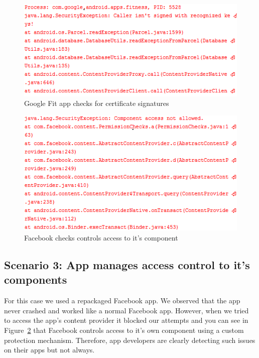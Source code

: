 \begin{figure}[tb]
\centering
	\includegraphics[width=\columnwidth]{images/GoogleProtections}
	\caption{Google Fit app checks for certificate signatures}
	\label{fig:GoogleProtections}
\end{figure}

\begin{figure}[tb]
\centering
	\includegraphics[width=\columnwidth]{images/FBProtections}
	\caption{Facebook checks controls access to it's component}
	\label{fig:FBProtections}
\end{figure}

\subsection{Scenario 3: App manages access control to it's components} For this case we used a repackaged Facebook app. We observed that the app never crashed and worked like a normal Facebook app. However, when we tried to access the app's content provider it blocked our attempts and you can see in Figure~\ref{fig:FBProtections} that Facebook controls access to it's own component using a custom protection mechanism. Therefore, app developers are clearly detecting such issues on their apps but not always.

